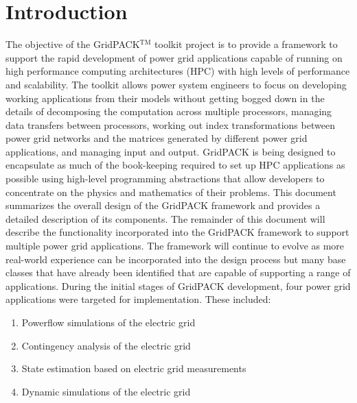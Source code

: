 \chapter{Introduction}

The objective of the GridPACK$\mathrm{{}^{TM}}$ toolkit project is to provide a framework to support the rapid development of power grid applications capable of running on high performance computing architectures (HPC) with high levels of performance and scalability. The toolkit allows power system engineers to focus on developing working applications from their models without getting bogged down in the details of decomposing the computation across multiple processors, managing data transfers between processors, working out index transformations between power grid networks and the matrices generated by different power grid applications, and managing input and output. GridPACK is being designed to encapsulate as much of the book-keeping required to set up HPC applications as possible using high-level programming abstractions that allow developers to concentrate on the physics and mathematics of their problems.  This document summarizes the overall design of the GridPACK framework and provides a detailed description of its components. The remainder of this document will describe the functionality incorporated into the GridPACK framework to support multiple power grid applications. The framework will continue to evolve as more real-world experience can be incorporated into the design process but many base classes that have already been identified that are capable of supporting a range of applications.
During the initial stages of GridPACK development, four power grid applications were targeted for implementation. These included:
\begin{enumerate}
\item  Powerflow simulations of the electric grid

\item  Contingency analysis of the electric grid

\item  State estimation based on electric grid measurements

\item  Dynamic simulations of the electric grid
\end{enumerate}

